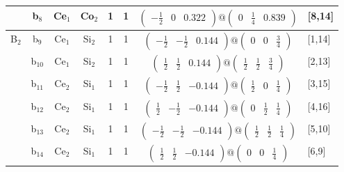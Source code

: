 \documentclass[fleqn,10pt,landscape]{article}
\begin{document}
\begin{itemize}
\begin{center}
\begin{longtable}{cc|cc|c|c|c|l}
& b$_{8}$ & Ce$_{1}$ & Co$_{2}$ & 1 & 1 & $\begin{pmatrix} - \frac{1}{2} & 0 & 0.322 \end{pmatrix}@\begin{pmatrix} 0 & \frac{1}{4} & 0.839 \end{pmatrix}$ & [8,14] \\ \hline
B$_{2}$ & b$_{9}$ & Ce$_{1}$ & Si$_{2}$ & 1 & 1 & $\begin{pmatrix} - \frac{1}{2} & - \frac{1}{2} & 0.144 \end{pmatrix}@\begin{pmatrix} 0 & 0 & \frac{3}{4} \end{pmatrix}$ & [1,14] \\
& b$_{10}$ & Ce$_{1}$ & Si$_{2}$ & 1 & 1 & $\begin{pmatrix} \frac{1}{2} & \frac{1}{2} & 0.144 \end{pmatrix}@\begin{pmatrix} \frac{1}{2} & \frac{1}{2} & \frac{3}{4} \end{pmatrix}$ & [2,13] \\
& b$_{11}$ & Ce$_{2}$ & Si$_{1}$ & 1 & 1 & $\begin{pmatrix} - \frac{1}{2} & \frac{1}{2} & -0.144 \end{pmatrix}@\begin{pmatrix} \frac{1}{2} & 0 & \frac{1}{4} \end{pmatrix}$ & [3,15] \\
& b$_{12}$ & Ce$_{2}$ & Si$_{1}$ & 1 & 1 & $\begin{pmatrix} \frac{1}{2} & - \frac{1}{2} & -0.144 \end{pmatrix}@\begin{pmatrix} 0 & \frac{1}{2} & \frac{1}{4} \end{pmatrix}$ & [4,16] \\
& b$_{13}$ & Ce$_{2}$ & Si$_{1}$ & 1 & 1 & $\begin{pmatrix} - \frac{1}{2} & - \frac{1}{2} & -0.144 \end{pmatrix}@\begin{pmatrix} \frac{1}{2} & \frac{1}{2} & \frac{1}{4} \end{pmatrix}$ & [5,10] \\
& b$_{14}$ & Ce$_{2}$ & Si$_{1}$ & 1 & 1 & $\begin{pmatrix} \frac{1}{2} & \frac{1}{2} & -0.144 \end{pmatrix}@\begin{pmatrix} 0 & 0 & \frac{1}{4} \end{pmatrix}$ & [6,9] \\

\end{longtable}
\end{center}
\end{itemize}
\end{document}
